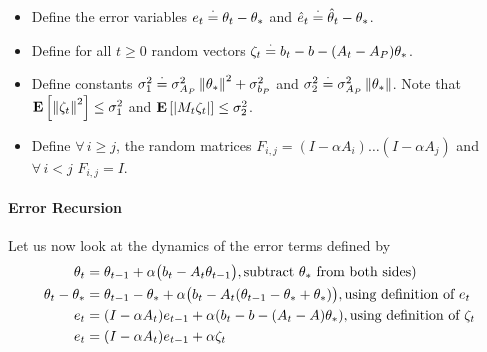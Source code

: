 \begin{definition}\label{def:err}
\begin{itemize}[leftmargin=*, before = \leavevmode\vspace{-\baselineskip}]
\item Define the error variables $e_t\stackrel{\cdot}{=} \theta_t-\theta_*$ and $\hat{e}_t\stackrel{\cdot}{=} \hat{\theta}_t-\theta_*$.
\item Define for all $ t\geq 0$ random vectors $\zeta_t\stackrel{\cdot}{=} b_t-b-(A_t-A_P)\theta_*$.
\item Define constants $\sigma_1^2\stackrel{\cdot}{=}\sigma_{A_P}^2\left\| \theta_*\right\|^2+\sigma_{b_P}^2$ and $\sigma_2^2\stackrel{\cdot}{=}\sigma_{A_P}^2\left\| \theta_*\right\|$. Note that $\mathbf{E}\left[\left\| \zeta_t\right\|^2\right]\leq \sigma_1^2$ and $\mathbf{E}\left[\left|M_t\zeta_t\right|\right]\leq \sigma_2^2$.
\item Define $\forall\,i\geq j$, the random matrices $F_{i,j}=(I-\alpha A_i)\ldots (I-\alpha A_j)$ and $\forall \,i<j$ $F_{i,j}=I$.
\end{itemize}
\end{definition}



\paragraph{Error Recursion} Let us now look at the dynamics of the error terms defined by
\begin{align}\label{eq:errrec}
\begin{split}
\theta_t&=\theta_{t-1}+\alpha\big(b_t-A_t\theta_{t-1}\big), \text{subtract $\theta_*$ from both sides})\\
\theta_t-\theta_*&=\theta_{t-1}-\theta_*+\alpha\big(b_t-A_t(\theta_{t-1}-\theta_*+\theta_*)\big), \text{using definition of $e_t$}\\
e_t&=(I-\alpha A_t)e_{t-1}+\alpha(b_t -b -(A_t-A)\theta_*), \text{using definition of $\zeta_t$}\\
e_t&=(I-\alpha A_t)e_{t-1}+\alpha\zeta_t
\end{split}
\end{align}


